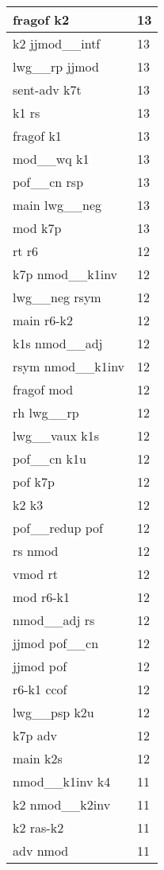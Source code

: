 \documentclass[a4 paper]{article}
\begin{document}
\begin{longtable}{p{}p{}}
fragof k2  & 13 \\ \midrule
k2 jjmod\_\_intf  & 13 \\ \midrule
lwg\_\_rp jjmod  & 13 \\ \midrule
sent-adv k7t  & 13 \\ \midrule
k1 rs  & 13 \\ \midrule
fragof k1  & 13 \\ \midrule
mod\_\_wq k1  & 13 \\ \midrule
pof\_\_cn rsp  & 13 \\ \midrule
main lwg\_\_neg  & 13 \\ \midrule
mod k7p  & 13 \\ \midrule
rt r6  & 12 \\ \midrule
k7p nmod\_\_k1inv  & 12 \\ \midrule
lwg\_\_neg rsym  & 12 \\ \midrule
main r6-k2  & 12 \\ \midrule
k1s nmod\_\_adj  & 12 \\ \midrule
rsym nmod\_\_k1inv  & 12 \\ \midrule
fragof mod  & 12 \\ \midrule
rh lwg\_\_rp  & 12 \\ \midrule
lwg\_\_vaux k1s  & 12 \\ \midrule
pof\_\_cn k1u  & 12 \\ \midrule
pof k7p  & 12 \\ \midrule
k2 k3  & 12 \\ \midrule
pof\_\_redup pof  & 12 \\ \midrule
rs nmod  & 12 \\ \midrule
vmod rt  & 12 \\ \midrule
mod r6-k1  & 12 \\ \midrule
nmod\_\_adj rs  & 12 \\ \midrule
jjmod pof\_\_cn  & 12 \\ \midrule
jjmod pof  & 12 \\ \midrule
r6-k1 ccof  & 12 \\ \midrule
lwg\_\_psp k2u  & 12 \\ \midrule
k7p adv  & 12 \\ \midrule
main k2s  & 12 \\ \midrule
nmod\_\_k1inv k4  & 11 \\ \midrule
k2 nmod\_\_k2inv  & 11 \\ \midrule
k2 ras-k2  & 11 \\ \midrule
adv nmod  & 11 \\ \midrule

\end{longtable}
\end{document}

